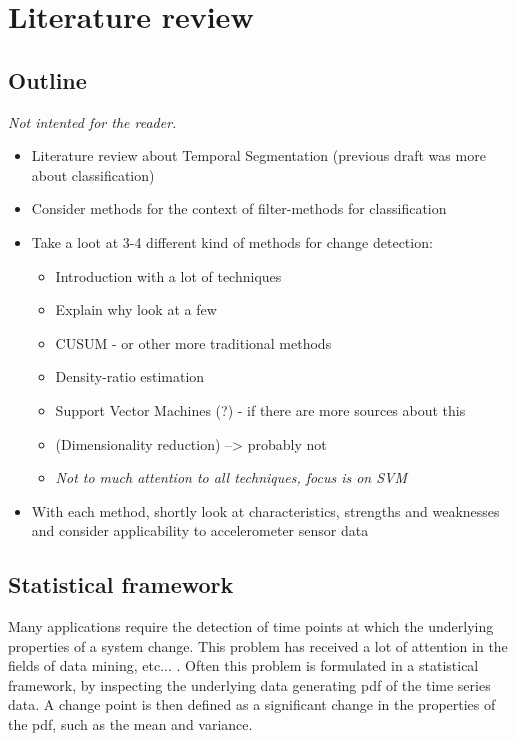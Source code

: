 
\chapter{Literature review}

\label{Chapter2} %


\section{Outline}
\emph{Not intented for the reader.}
\begin{itemize}
  \item Literature review about Temporal Segmentation (previous draft was more about classification)
  \item Consider methods for the context of filter-methods for classification
  \item Take a loot at 3-4 different kind of methods for change detection:
    \begin{itemize}
      \item Introduction with a lot of techniques
      \item Explain why look at a few
      \item CUSUM - or other more traditional methods
      \item Density-ratio estimation
      \item Support Vector Machines (?) - if there are more sources about this
      \item (Dimensionality reduction) --> probably not
      \item \emph{Not to much attention to all techniques, focus is on SVM}
    \end{itemize}
  \item With each method, shortly look at characteristics, strengths and weaknesses and consider applicability to accelerometer sensor data
\end{itemize}


\section{Statistical framework}\label{statistical-framework}
Many applications require the detection of time points at which the underlying properties of a system change.
This problem has received a lot of attention in the fields of data mining, etc... .
Often this problem is formulated in a statistical framework, by inspecting the underlying data generating \gls{pdf} of the time series data.
A change point is then defined as a significant change in the properties of the \gls{pdf}, such as the mean and variance.


